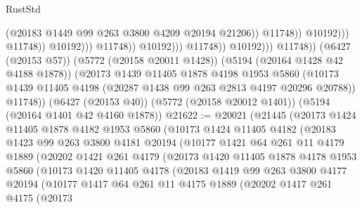\begin{lexlean}{RustStd}
\begin{coremodule}
                                                    (@20183
                                                      @1449
                                                      @99
                                                      @263
                                                      @3800
                                                      @4209
                                                      @20194
                                                      @21206))
                                                  @11748))
                                              @10192)))
                                        @11748))
                                    @10192)))
                              @11748))
                          @10192)))
                    @11748))
                @10192)))
          @11748))
      (@6427 (@20153 @57))
      (@5772 (@20158 @20011 @1428))
      (@5194 (@20164 @1428 @42 @4188 @1878))
      (@20173
        @1439
        @11405
        @1878
        @4198
        @1953
        @5860
        (@10173 @1439 @11405 @4198 (@20287 @1438 @99 @263 @2813 @4197 @20296 @20788))
        @11748))
    (@6427 (@20153 @40))
    (@5772 (@20158 @20012 @1401))
    (@5194 (@20164 @1401 @42 @4160 @1878))
@21622 := @20021
    (@21445
      (@20173
        @1424
        @11405
        @1878
        @4182
        @1953
        @5860
        (@10173
          @1424
          @11405
          @4182
          (@20183
            @1423
            @99
            @263
            @3800
            @4181
            @20194
            (@10177
              @1421
              @64
              @261
              @11
              @4179
              @1889
              (@20202
                @1421
                @261
                @4179
                (@20173
                  @1420
                  @11405
                  @1878
                  @4178
                  @1953
                  @5860
                  (@10173
                    @1420
                    @11405
                    @4178
                    (@20183
                      @1419
                      @99
                      @263
                      @3800
                      @4177
                      @20194
                      (@10177
                        @1417
                        @64
                        @261
                        @11
                        @4175
                        @1889
                        (@20202
                          @1417
                          @261
                          @4175
                          (@20173

\end{coremodule}
\end{lexlean}
